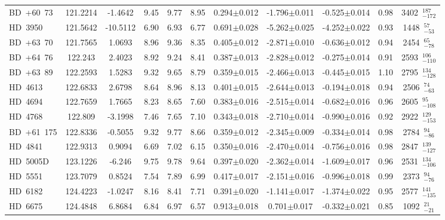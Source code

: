 {\begin{longtable}{lcccccccccc}
BD~+60~73 & 121.2214 & -1.4642 & 9.45 & 9.77 & 8.95 & 0.294$\pm$0.012 & -1.796$\pm$0.011 & -0.525$\pm$0.014 & 0.98 & 3402~$_{-172}^{187}$ \\
\noalign{\smallskip}
HD~3950 & 121.5642 & -10.5112 & 6.90 & 6.93 & 6.77 & 0.691$\pm$0.028 & -5.262$\pm$0.025 & -4.252$\pm$0.022 & 0.93 & 1448~$_{-53}^{57}$ \\
\noalign{\smallskip}
BD~+63~70 & 121.7565 & 1.0693 & 8.96 & 9.36 & 8.35 & 0.405$\pm$0.012 & -2.871$\pm$0.010 & -0.636$\pm$0.012 & 0.94 & 2454~$_{-78}^{65}$ \\
\noalign{\smallskip}
BD~+64~76 & 122.243 & 2.4023 & 8.92 & 9.24 & 8.41 & 0.387$\pm$0.013 & -2.828$\pm$0.012 & -0.275$\pm$0.014 & 0.91 & 2593~$_{-110}^{106}$ \\
\noalign{\smallskip}
BD~+63~89 & 122.2593 & 1.5283 & 9.32 & 9.65 & 8.79 & 0.359$\pm$0.015 & -2.466$\pm$0.013 & -0.445$\pm$0.015 & 1.10 & 2795~$_{-128}^{134}$ \\
\noalign{\smallskip}
HD~4613 & 122.6833 & 2.6798 & 8.64 & 8.96 & 8.13 & 0.401$\pm$0.015 & -2.644$\pm$0.013 & -0.194$\pm$0.018 & 0.94 & 2506~$_{-63}^{74}$ \\
\noalign{\smallskip}
HD~4694 & 122.7659 & 1.7665 & 8.23 & 8.65 & 7.60 & 0.383$\pm$0.016 & -2.515$\pm$0.014 & -0.682$\pm$0.016 & 0.96 & 2605~$_{-108}^{95}$ \\
\noalign{\smallskip}
HD~4768 & 122.809 & -3.1998 & 7.46 & 7.65 & 7.10 & 0.343$\pm$0.018 & -2.710$\pm$0.014 & -0.990$\pm$0.016 & 0.92 & 2922~$_{-153}^{129}$ \\
\noalign{\smallskip}
BD~+61~175 & 122.8336 & -0.5055 & 9.32 & 9.77 & 8.66 & 0.359$\pm$0.012 & -2.345$\pm$0.009 & -0.334$\pm$0.014 & 0.98 & 2784~$_{-86}^{94}$ \\
\noalign{\smallskip}
HD~4841 & 122.9313 & 0.9094 & 6.69 & 7.02 & 6.15 & 0.350$\pm$0.016 & -2.470$\pm$0.014 & -0.756$\pm$0.016 & 0.98 & 2847~$_{-127}^{139}$ \\
\noalign{\smallskip}
HD~5005D & 123.1226 & -6.246 & 9.75 & 9.78 & 9.64 & 0.397$\pm$0.020 & -2.362$\pm$0.014 & -1.609$\pm$0.017 & 0.96 & 2531~$_{-106}^{134}$ \\
\noalign{\smallskip}
HD~5551 & 123.7079 & 0.8524 & 7.54 & 7.89 & 6.99 & 0.417$\pm$0.017 & -2.151$\pm$0.016 & -0.996$\pm$0.018 & 0.99 & 2373~$_{-76}^{94}$ \\
\noalign{\smallskip}
HD~6182 & 124.4223 & -1.0247 & 8.16 & 8.41 & 7.71 & 0.391$\pm$0.020 & -1.141$\pm$0.017 & -1.374$\pm$0.022 & 0.95 & 2577~$_{-135}^{141}$ \\
\noalign{\smallskip}
HD~6675 & 124.4848 & 6.8684 & 6.84 & 6.97 & 6.57 & 0.913$\pm$0.018 & 0.701$\pm$0.017 & -0.332$\pm$0.021 & 0.85 & 1092~$_{-21}^{21}$ \\

\end{longtable}}
